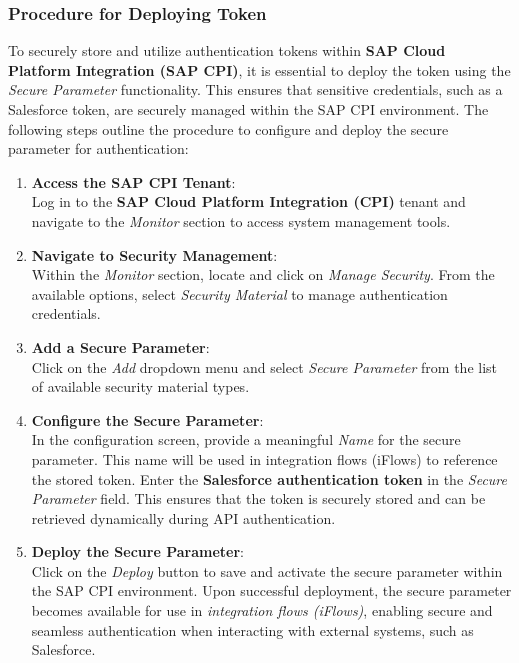 \subsubsection{Procedure for Deploying Token}

To securely store and utilize authentication tokens within \textbf{SAP Cloud Platform Integration (SAP CPI)}, it is essential to deploy the token using the \textit{Secure Parameter} functionality. This ensures that sensitive credentials, such as a Salesforce token, are securely managed within the SAP CPI environment. The following steps outline the procedure to configure and deploy the secure parameter for authentication:

\begin{enumerate}
    \item \textbf{Access the SAP CPI Tenant}: \\
    Log in to the \textbf{SAP Cloud Platform Integration (CPI)} tenant and navigate to the \textit{Monitor} section to access system management tools.
    
    \item \textbf{Navigate to Security Management}: \\
    Within the \textit{Monitor} section, locate and click on \textit{Manage Security}. From the available options, select \textit{Security Material} to manage authentication credentials.
    
    \item \textbf{Add a Secure Parameter}: \\
    Click on the \textit{Add} dropdown menu and select \textit{Secure Parameter} from the list of available security material types.
    
    \item \textbf{Configure the Secure Parameter}: \\
    In the configuration screen, provide a meaningful \textit{Name} for the secure parameter. This name will be used in integration flows (iFlows) to reference the stored token. Enter the \textbf{Salesforce authentication token} in the \textit{Secure Parameter} field. This ensures that the token is securely stored and can be retrieved dynamically during API authentication.
    
    \item \textbf{Deploy the Secure Parameter}: \\
    Click on the \textit{Deploy} button to save and activate the secure parameter within the SAP CPI environment. Upon successful deployment, the secure parameter becomes available for use in \textit{integration flows (iFlows)}, enabling secure and seamless authentication when interacting with external systems, such as Salesforce.
\end{enumerate}

